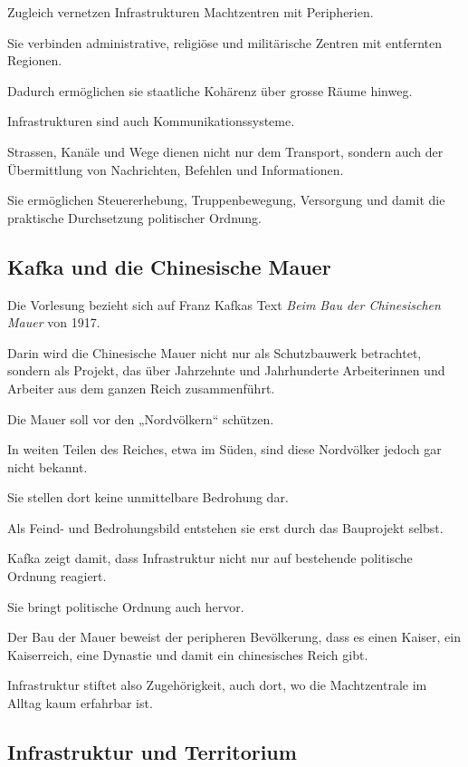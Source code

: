 Zugleich vernetzen Infrastrukturen
Machtzentren mit Peripherien.

Sie verbinden administrative,
religiöse
und militärische Zentren
mit entfernten Regionen.

Dadurch ermöglichen sie staatliche Kohärenz
über grosse Räume hinweg.

Infrastrukturen sind auch Kommunikationssysteme.

Strassen,
Kanäle
und Wege dienen nicht nur dem Transport,
sondern auch der Übermittlung von Nachrichten,
Befehlen
und Informationen.

Sie ermöglichen Steuererhebung,
Truppenbewegung,
Versorgung
und damit die praktische Durchsetzung
politischer Ordnung.

\subsection{Kafka und die Chinesische Mauer}

Die Vorlesung bezieht sich auf Franz Kafkas Text
\emph{Beim Bau der Chinesischen Mauer} von 1917.

Darin wird die Chinesische Mauer
nicht nur als Schutzbauwerk betrachtet,
sondern als Projekt,
das über Jahrzehnte und Jahrhunderte
Arbeiterinnen und Arbeiter
aus dem ganzen Reich zusammenführt.

Die Mauer soll vor den „Nordvölkern“ schützen.

In weiten Teilen des Reiches,
etwa im Süden,
sind diese Nordvölker jedoch gar nicht bekannt.

Sie stellen dort keine unmittelbare Bedrohung dar.

Als Feind-
und Bedrohungsbild entstehen sie
erst durch das Bauprojekt selbst.

Kafka zeigt damit,
dass Infrastruktur nicht nur
auf bestehende politische Ordnung reagiert.

Sie bringt politische Ordnung
auch hervor.

Der Bau der Mauer beweist
der peripheren Bevölkerung,
dass es einen Kaiser,
ein Kaiserreich,
eine Dynastie
und damit ein chinesisches Reich gibt.

Infrastruktur stiftet also Zugehörigkeit,
auch dort,
wo die Machtzentrale
im Alltag kaum erfahrbar ist.

\subsection{Infrastruktur und Territorium}

